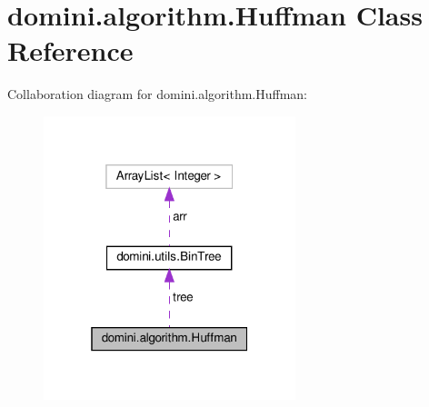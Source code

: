 \hypertarget{classdomini_1_1algorithm_1_1Huffman}{}\section{domini.\+algorithm.\+Huffman Class Reference}
\label{classdomini_1_1algorithm_1_1Huffman}


Collaboration diagram for domini.\+algorithm.\+Huffman\+:
\nopagebreak
\begin{figure}[H]
\begin{center}
\leavevmode
\includegraphics[width=208pt]{classdomini_1_1algorithm_1_1Huffman__coll__graph}
\end{center}
\end{figure}
